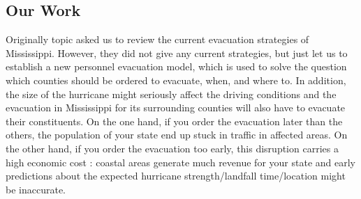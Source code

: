 \documentclass{mcmthesis}	%
\begin{document}
%

\subsection{Our Work}%

Originally topic asked us to review the current evacuation strategies of Mississippi. However, they did not give any current strategies, but just let us to establish a new personnel evacuation model, which is used to solve the question which counties should be ordered to evacuate, when, and where to. In addition, the size of the hurricane might seriously affect the driving conditions and the evacuation in Mississippi for its surrounding counties will also have to evacuate their constituents. On the one hand, if you order the evacuation later than the others, the population of your state end up stuck in traffic in affected areas. On the other hand, if you order the evacuation too early, this disruption carries a high economic cost : coastal areas generate much revenue for your state and early predictions about the expected hurricane strength/landfall time/location might be inaccurate.
\end{document}
